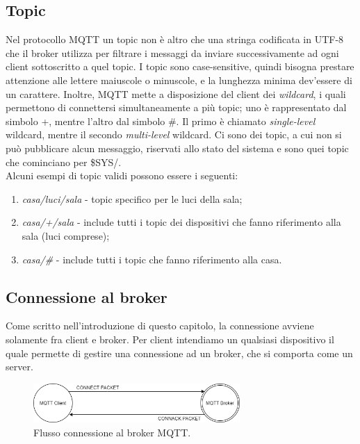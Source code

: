 \documentclass[binding=0.6cm,TFA]{sapthesis}
\begin{document}
\begin{large}
\subsection{Topic}
Nel protocollo MQTT un topic non è altro che una stringa codificata in UTF-8 che il broker utilizza per filtrare i messaggi da inviare successivamente ad ogni client sottoscritto a quel topic. I topic sono case-sensitive, quindi bisogna prestare attenzione alle lettere maiuscole o minuscole, e la lunghezza minima dev'essere di un carattere. Inoltre, MQTT mette a disposizione del client dei \textit{wildcard}, i quali permettono di connettersi simultaneamente a più topic; uno è rappresentato dal simbolo +, mentre l'altro dal simbolo \#. Il primo è chiamato \textit{single-level} wildcard, mentre il secondo \textit{multi-level} wildcard. Ci sono dei topic, a cui non si può pubblicare alcun messaggio, riservati allo stato del sistema e sono quei topic che cominciano per \$SYS/. \\
Alcuni esempi di topic validi possono essere i seguenti: 
\begin{enumerate}
\item \textit{casa/luci/sala} - topic specifico per le luci della sala;
\item \textit{casa/+/sala} - include tutti i topic dei dispositivi che fanno riferimento alla sala (luci comprese);
\item \textit{casa/\#} - include tutti i topic che fanno riferimento alla casa.
\end{enumerate}


\subsection{Connessione al broker}
Come scritto nell'introduzione di questo capitolo, la connessione avviene solamente fra client e broker. Per client intendiamo un qualsiasi dispositivo il quale permette di gestire una connessione ad un broker, che si comporta come un server. 

\begin{figure}[h]
\centering
\includegraphics[width=0.7\textwidth]{images/connect-connack.png}
\caption{Flusso connessione al broker MQTT.}
\label{fig:connect-connack}
\end{figure}


\end{large}
\end{document}
